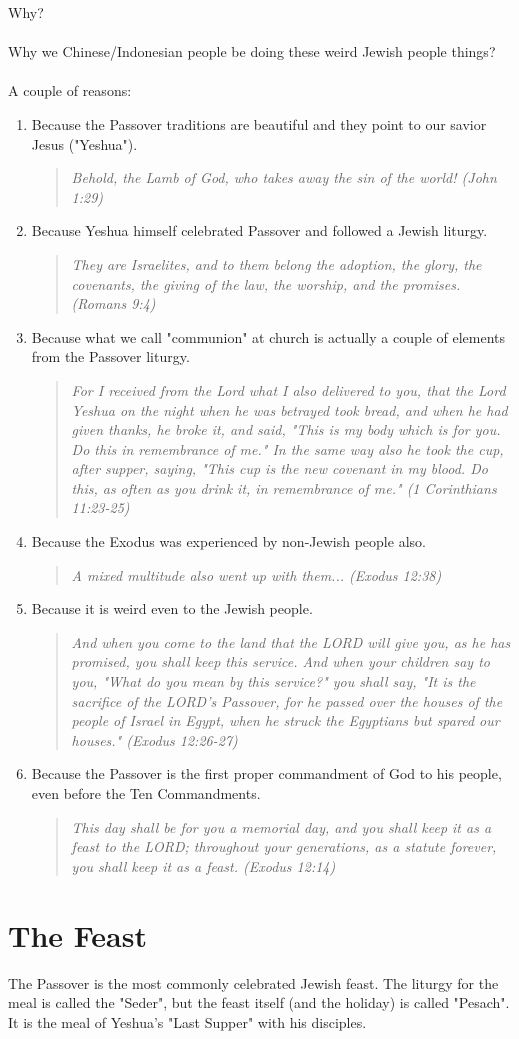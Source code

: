 \documentclass[10pt,oneside,footinclude=true,headinclude=true]{scrbook} %
\newcommand\quot[1]{
	\begin{quote}\textit{\small#1}\end{quote}
}
\begin{document}
Why?\\
\\
Why we Chinese/Indonesian people be doing these weird Jewish people things?\\
\\
A couple of reasons:
\begin{enumerate}
	\item{
		Because the Passover traditions are beautiful and they point to our savior Jesus ("Yeshua").
		\quot{Behold, the Lamb of God, who takes away the sin of the world! (John 1:29)}
	}
	\item{
		Because Yeshua himself celebrated Passover and followed a Jewish liturgy.
		\quot{They are Israelites, and to them belong the adoption, the glory, the covenants, the giving of the law, the worship, and the promises. (Romans 9:4)}
	}
	\item{
		Because what we call "communion" at church is actually a couple of elements from the Passover liturgy.
		\quot{For I received from the Lord what I also delivered to you, that the Lord Yeshua on the night when he was betrayed took bread, and when he had given thanks, he broke it, and said, "This is my body which is for you. Do this in remembrance of me." In the same way also he took the cup, after supper, saying, "This cup is the new covenant in my blood. Do this, as often as you drink it, in remembrance of me." (1 Corinthians 11:23-25)}
	}
	\item{
		Because the Exodus was experienced by non-Jewish people also.
		\quot{A mixed multitude also went up with them... (Exodus 12:38)}
	}
	\item{
		Because it is weird even to the Jewish people.
		\quot{And when you come to the land that the LORD will give you, as he has promised, you shall keep this service. And when your children say to you, "What do you mean by this service?" you shall say, "It is the sacrifice of the LORD's Passover, for he passed over the houses of the people of Israel in Egypt, when he struck the Egyptians but spared our houses." (Exodus 12:26-27)}
	}
	\item{
		Because the Passover is the first proper commandment of God to his people, even before the Ten Commandments.
		\quot{This day shall be for you a memorial day, and you shall keep it as a feast to the LORD; throughout your generations, as a statute forever, you shall keep it as a feast. (Exodus 12:14)}
	}
\end{enumerate}


\section{The Feast}
The Passover is the most commonly celebrated Jewish feast. The liturgy for the meal is called the "Seder", but the feast itself (and the holiday) is called "Pesach". It is the meal of Yeshua's "Last Supper" with his disciples.
\end{document}

